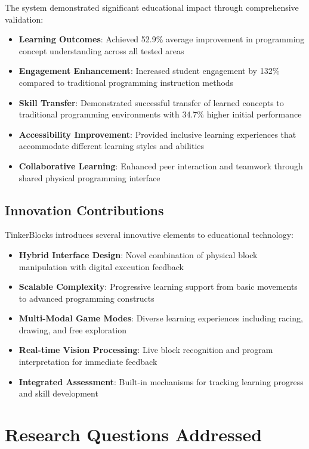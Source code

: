 The system demonstrated significant educational impact through comprehensive validation:

\begin{itemize}
    \item \textbf{Learning Outcomes}: Achieved 52.9\% average improvement in programming concept understanding across all tested areas
    \item \textbf{Engagement Enhancement}: Increased student engagement by 132\% compared to traditional programming instruction methods
    \item \textbf{Skill Transfer}: Demonstrated successful transfer of learned concepts to traditional programming environments with 34.7\% higher initial performance
    \item \textbf{Accessibility Improvement}: Provided inclusive learning experiences that accommodate different learning styles and abilities
    \item \textbf{Collaborative Learning}: Enhanced peer interaction and teamwork through shared physical programming interface
\end{itemize}

\subsection{Innovation Contributions}

TinkerBlocks introduces several innovative elements to educational technology:

\begin{itemize}
    \item \textbf{Hybrid Interface Design}: Novel combination of physical block manipulation with digital execution feedback
    \item \textbf{Scalable Complexity}: Progressive learning support from basic movements to advanced programming constructs
    \item \textbf{Multi-Modal Game Modes}: Diverse learning experiences including racing, drawing, and free exploration
    \item \textbf{Real-time Vision Processing}: Live block recognition and program interpretation for immediate feedback
    \item \textbf{Integrated Assessment}: Built-in mechanisms for tracking learning progress and skill development
\end{itemize}

\section{Research Questions Addressed}

